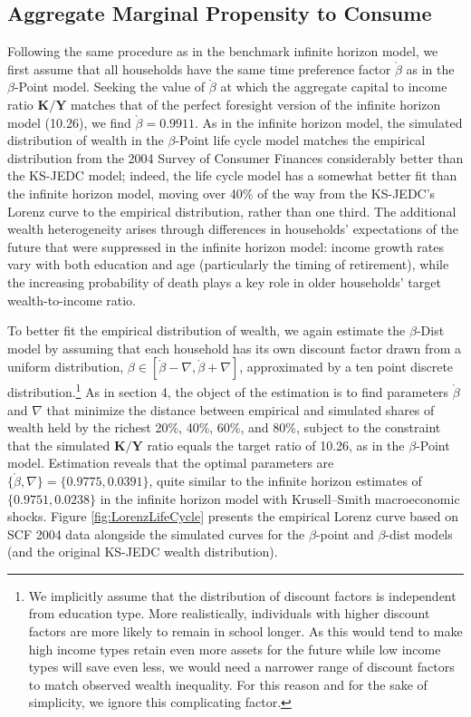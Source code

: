 \documentclass{econtex}\usepackage[pdftex]{graphicx}\usepackage{epstopdf} \usepackage[pdftex]{hyperref}
\newcommand{\Discount}{\ensuremath{\beta}}
\newcommand{\KLev}{\ensuremath{\pmb{K}}}
\newcommand{\YLev}{\ensuremath{\pmb{Y}}}
\begin{document}
\subsection{Aggregate Marginal Propensity to Consume}

Following the same procedure as in the benchmark infinite horizon model, we first assume that all households have the same time preference factor $\grave{\Discount}$ as in the \Discount-Point model.  Seeking the value of $\grave{\Discount}$ at which the aggregate capital to income ratio $\KLev/\YLev$ matches that of the perfect foresight version of the infinite horizon model (10.26), we find $\grave{\Discount} = 0.9911$.  As in the infinite horizon model, the simulated distribution of wealth in the \Discount-Point life cycle model matches the empirical distribution from the 2004 Survey of Consumer Finances considerably better than the KS-JEDC model; indeed, the life cycle model has a somewhat better fit than the infinite horizon model, moving over 40\% of the way from the KS-JEDC's Lorenz curve to the empirical distribution, rather than one third.  The additional wealth heterogeneity arises through differences in households' expectations of the future that were suppressed in the infinite horizon model: income growth rates vary with both education and age (particularly the timing of retirement), while the increasing probability of death plays a key role in older households' target wealth-to-income ratio.

To better fit the empirical distribution of wealth, we again estimate the \Discount-Dist model by assuming that each household has its own discount factor drawn from a uniform distribution, $\Discount \in [\grave{\Discount} - \nabla,\grave{\Discount} + \nabla]$, approximated by a ten point discrete distribution.\footnote{We implicitly assume that the distribution of discount factors is independent from education type.  More realistically, individuals with higher discount factors are more likely to remain in school longer.  As this would tend to make high income types retain even more assets for the future while low income types will save even less, we would need a narrower range of discount factors to match observed wealth inequality.  For this reason and for the sake of simplicity, we ignore this complicating factor.}  As in section 4, the object of the estimation is to find parameters $\grave{\Discount}$ and $\nabla$ that minimize the distance between empirical and simulated shares of wealth held by the richest 20\%, 40\%, 60\%, and 80\%, subject to the constraint that the simulated $\KLev/\YLev$ ratio equals the target ratio of 10.26, as in the \Discount-Point model.  Estimation reveals that the optimal parameters are $\{\grave{\Discount},\nabla\} = \{0.9775, 0.0391\}$, quite similar to the infinite horizon estimates of $\{0.9751, 0.0238\}$ in the infinite horizon model with Krusell--Smith macroeconomic shocks.  Figure \ref{fig:LorenzLifeCycle} presents the empirical Lorenz curve based on SCF 2004 data alongside the simulated curves for the \Discount-point and \Discount-dist models (and the original KS-JEDC wealth distribution).%
\end{document}
